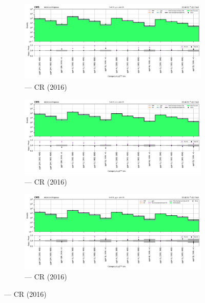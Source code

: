 \begin{figure}[htbp]
    \centering
    \begin{subfigure}[b]{0.66\textwidth}
        \includegraphics[width=\textwidth]{chapters/higgstoinv/figures/mountain_ranges/2016/ggF/Wmunu_tree_fit_s-abs_values_ggF_cats.pdf}
        \caption{\ggH --- \singleMuCr \gls{CR} (2016)}
    \end{subfigure}

    \begin{subfigure}[b]{0.66\textwidth}
        \includegraphics[width=\textwidth]{chapters/higgstoinv/figures/mountain_ranges/2016/ggF/Wenu_tree_fit_s-abs_values_ggF_cats.pdf}
        \caption{\ggH --- \singleEleCr \gls{CR} (2016)}
    \end{subfigure}

    \begin{subfigure}[b]{0.66\textwidth}
        \includegraphics[width=\textwidth]{chapters/higgstoinv/figures/mountain_ranges/2016/ggF/Zmumu_tree_fit_s-abs_values_ggF_cats.pdf}
        \caption{\ggH --- \doubleMuCr \gls{CR} (2016)}
    \end{subfigure}


\end{figure}
